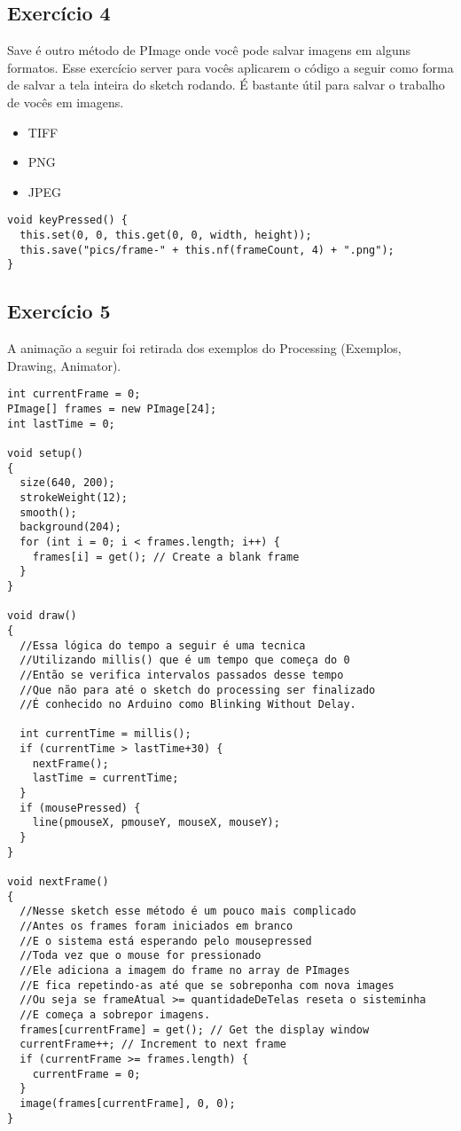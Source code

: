 \documentclass[12pt]{article}
\begin{document}
\subsection{Exercício 4}

\qquad Save é outro método de PImage onde você pode salvar imagens em alguns formatos. Esse exercício server para vocês aplicarem o código a seguir como forma de salvar a tela inteira do sketch rodando. É bastante útil para salvar o trabalho de vocês em imagens.

\begin{itemize}
\item TIFF
\item PNG
\item JPEG
\end{itemize}


\begin{verbatim}
void keyPressed() {
  this.set(0, 0, this.get(0, 0, width, height));
  this.save("pics/frame-" + this.nf(frameCount, 4) + ".png");
}
\end{verbatim}

\subsection{Exercício 5}
A animação a seguir foi retirada dos exemplos do Processing (Exemplos, Drawing, Animator).

\begin{verbatim}
int currentFrame = 0;
PImage[] frames = new PImage[24];
int lastTime = 0;

void setup()
{
  size(640, 200);
  strokeWeight(12);
  smooth();
  background(204);
  for (int i = 0; i < frames.length; i++) {
    frames[i] = get(); // Create a blank frame
  }
}

void draw()
{
  //Essa lógica do tempo a seguir é uma tecnica
  //Utilizando millis() que é um tempo que começa do 0
  //Então se verifica intervalos passados desse tempo
  //Que não para até o sketch do processing ser finalizado
  //É conhecido no Arduino como Blinking Without Delay.

  int currentTime = millis();
  if (currentTime > lastTime+30) {
    nextFrame();
    lastTime = currentTime;
  }
  if (mousePressed) {
    line(pmouseX, pmouseY, mouseX, mouseY);
  }
}

void nextFrame()
{
  //Nesse sketch esse método é um pouco mais complicado
  //Antes os frames foram iniciados em branco
  //E o sistema está esperando pelo mousepressed
  //Toda vez que o mouse for pressionado
  //Ele adiciona a imagem do frame no array de PImages
  //E fica repetindo-as até que se sobreponha com nova images
  //Ou seja se frameAtual >= quantidadeDeTelas reseta o sisteminha
  //E começa a sobrepor imagens.
  frames[currentFrame] = get(); // Get the display window
  currentFrame++; // Increment to next frame
  if (currentFrame >= frames.length) {
    currentFrame = 0;
  }
  image(frames[currentFrame], 0, 0);
}
\end{verbatim}
\end{document}
